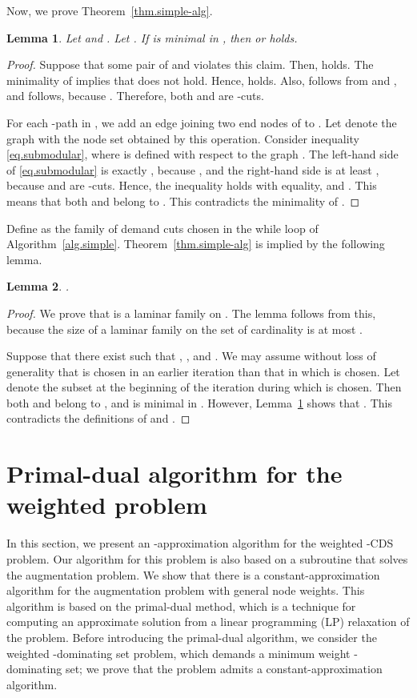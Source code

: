 \documentclass[11pt]{article}
\newtheorem{lemma}{Lemma}
\begin{document}
 
 Now, we prove Theorem~\ref{thm.simple-alg}.
 \begin{lemma}
  \label{lem.crossing}
  Let  and .
  Let . If  is minimal in , then
   or  holds.
  \end{lemma}
\begin{proof}
 Suppose that
 some pair of  and  violates this claim.
  Then,  holds.
  The minimality of  implies that  does not
 hold.
  Hence, 
  holds.
 Also,  follows from
  and , and
  follows, because
 .
 Therefore, both  and  are -cuts.

 For each -path  in ,
 we add an edge joining two end nodes of  to .
 Let  denote the graph with the node set  obtained by this operation. 
 Consider inequality \eqref{eq.submodular}, where  is
 defined with respect to the graph .
 The left-hand side of  \eqref{eq.submodular} is exactly ,
 because ,
 and the right-hand side is at least ,
 because  and  are -cuts.
 Hence, the inequality holds with equality, and
 .
 This means that both  and  belong to .
 This contradicts the minimality  of .
\end{proof}

Define  as the family of demand cuts
chosen in the while loop of Algorithm~\ref{alg.simple}.
Theorem~\ref{thm.simple-alg} is implied by the following lemma.

 \begin{lemma}
  \label{lem.laminarity}
 .
 \end{lemma}
 \begin{proof}
  We prove that  is a laminar family
  on .
  The lemma follows from this, because the size of a laminar family
  on the set of cardinality  is at most .
  
Suppose that there exist  such that
 , , and .
  We may assume without loss of generality that
   is chosen in an earlier iteration than that in which  is chosen.
  Let  denote the subset at the beginning of the iteration during which  is chosen.
  Then
  both  and  belong to ,
  and  is minimal in .
  However, Lemma~\ref{lem.crossing} shows that
  .
    This contradicts the definitions of  and .
 \end{proof}

 

\section{Primal-dual algorithm for the weighted problem}
\label{sec.primal-dual}

In this section, we present an -approximation algorithm
for the weighted -CDS problem.
Our algorithm for this problem is also based on a subroutine that
solves the augmentation problem. We show that there is a
constant-approximation algorithm for the augmentation problem with general
node weights.
This algorithm is based on the primal-dual method, which is a technique
for computing an approximate solution from a linear programming (LP) relaxation of the problem.
Before introducing the primal-dual algorithm, we consider the
weighted -dominating set problem, which 
demands a minimum weight -dominating set;
we prove that the problem admits a constant-approximation algorithm.
\end{document}
